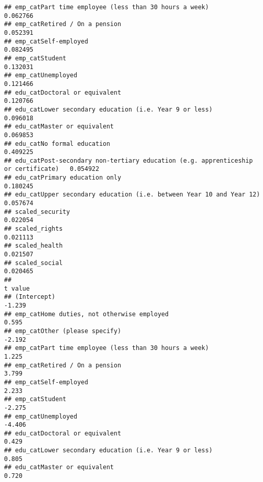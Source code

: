 \documentclass[
]{article}
\begin{document}
\begin{verbatim}
## emp_catPart time employee (less than 30 hours a week)                               0.062766
## emp_catRetired / On a pension                                                       0.052391
## emp_catSelf-employed                                                                0.082495
## emp_catStudent                                                                      0.132031
## emp_catUnemployed                                                                   0.121466
## edu_catDoctoral or equivalent                                                       0.120766
## edu_catLower secondary education (i.e. Year 9 or less)                              0.096018
## edu_catMaster or equivalent                                                         0.069853
## edu_catNo formal education                                                          0.409225
## edu_catPost-secondary non-tertiary education (e.g. apprenticeship or certificate)   0.054922
## edu_catPrimary education only                                                       0.180245
## edu_catUpper secondary education (i.e. between Year 10 and Year 12)                 0.057674
## scaled_security                                                                     0.022054
## scaled_rights                                                                       0.021113
## scaled_health                                                                       0.021507
## scaled_social                                                                       0.020465
##                                                                                   t value
## (Intercept)                                                                        -1.239
## emp_catHome duties, not otherwise employed                                          0.595
## emp_catOther (please specify)                                                      -2.192
## emp_catPart time employee (less than 30 hours a week)                               1.225
## emp_catRetired / On a pension                                                       3.799
## emp_catSelf-employed                                                                2.233
## emp_catStudent                                                                     -2.275
## emp_catUnemployed                                                                  -4.406
## edu_catDoctoral or equivalent                                                       0.429
## edu_catLower secondary education (i.e. Year 9 or less)                              0.805
## edu_catMaster or equivalent                                                         0.720

\end{verbatim}
\end{document}

